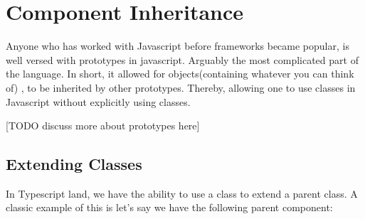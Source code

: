 \maketitle{}
\section{ Component Inheritance }

Anyone who has worked with Javascript before frameworks became popular, is well
versed with prototypes in javascript. Arguably the most complicated part of the
language. In short, it allowed for objects(containing whatever you can think of)
, to be inherited by other prototypes. Thereby, allowing one to use classes in
Javascript without explicitly using classes.

[TODO discuss more about prototypes here]

\subsection{ Extending Classes }
In Typescript land, we have the ability to use a class to extend a parent class.
A classic example of this is let's say we have the following parent component:


